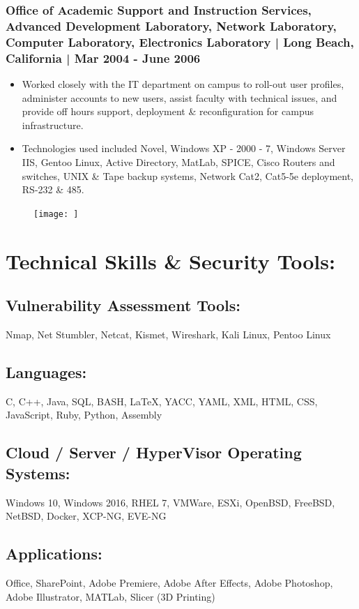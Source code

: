 \documentclass[letter,10pt]{article}
\begin{document}
\subsubsection*{Office of Academic Support and Instruction Services, Advanced Development Laboratory, Network Laboratory, Computer Laboratory, Electronics Laboratory | Long Beach, California | Mar 2004 - June 2006}
\label{sec:org70ab654}
\begin{itemize}
\item Worked closely with the IT department on campus to roll-out user profiles, administer accounts to new users, assist faculty with technical issues, and provide off hours support, deployment \& reconfiguration for campus infrastructure.
\item Technologies used included Novel, Windows XP - 2000 - 7, Windows Server IIS, Gentoo Linux, Active Directory, MatLab, SPICE, Cisco Routers and switches, UNIX \& Tape backup systems, Network Cat2, Cat5-5e deployment, RS-232 \& 485.
\end{itemize}
\begin{figure}
\texttt{[image: ]}
\end{figure}

\section*{Technical Skills \& Security Tools:}
\label{sec:org97433cf}
\subsection*{Vulnerability Assessment Tools:}
\label{sec:orgcc9f56a}
Nmap, Net Stumbler, Netcat, Kismet, Wireshark, Kali Linux, Pentoo Linux
\subsection*{Languages:}
\label{sec:org8d3d4ac}
C, C++, Java, SQL, BASH, \LaTeX{}, YACC, YAML, XML, HTML, CSS, JavaScript, Ruby, Python, Assembly
\subsection*{Cloud / Server / HyperVisor Operating Systems:}
\label{sec:orgbe6a2c5}
Windows 10, Windows 2016, RHEL 7, VMWare, ESXi, OpenBSD, FreeBSD, NetBSD, Docker, XCP-NG, EVE-NG
\subsection*{Applications:}
\label{sec:orgfa17d72}
Office, SharePoint, Adobe Premiere, Adobe After Effects, Adobe Photoshop, Adobe Illustrator, MATLab, Slicer (3D Printing)
\end{document}
